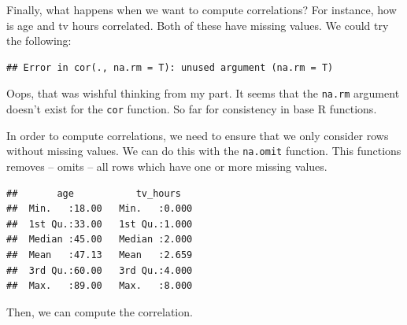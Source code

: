 \documentclass[]{tufte-book}
\newenvironment{Shaded}{}{}
\newcommand{\KeywordTok}[1]{\textcolor[rgb]{0.00,0.44,0.13}{\textbf{#1}}}
\newcommand{\DataTypeTok}[1]{\textcolor[rgb]{0.56,0.13,0.00}{#1}}
\newcommand{\StringTok}[1]{\textcolor[rgb]{0.25,0.44,0.63}{#1}}
\newcommand{\OperatorTok}[1]{\textcolor[rgb]{0.40,0.40,0.40}{#1}}
\newcommand{\NormalTok}[1]{#1}
\begin{document}
Finally, what happens when we want to compute correlations? For
instance, how is age and tv hours correlated. Both of these have missing
values. We could try the following:

\begin{Shaded}
\end{Shaded}

\begin{verbatim}
## Error in cor(., na.rm = T): unused argument (na.rm = T)
\end{verbatim}

Oops, that was wishful thinking from my part. It seems that the
\texttt{na.rm} argument doesn't exist for the \texttt{cor} function. So
far for consistency in base R functions.

In order to compute correlations, we need to ensure that we only
consider rows without missing values. We can do this with the
\texttt{na.omit} function. This functions removes -- omits -- all rows
which have one or more missing values.

\begin{Shaded}
\end{Shaded}

\begin{verbatim}
##       age           tv_hours    
##  Min.   :18.00   Min.   :0.000  
##  1st Qu.:33.00   1st Qu.:1.000  
##  Median :45.00   Median :2.000  
##  Mean   :47.13   Mean   :2.659  
##  3rd Qu.:60.00   3rd Qu.:4.000  
##  Max.   :89.00   Max.   :8.000
\end{verbatim}

Then, we can compute the correlation.

\begin{Shaded}
\end{Shaded}
\end{document}
